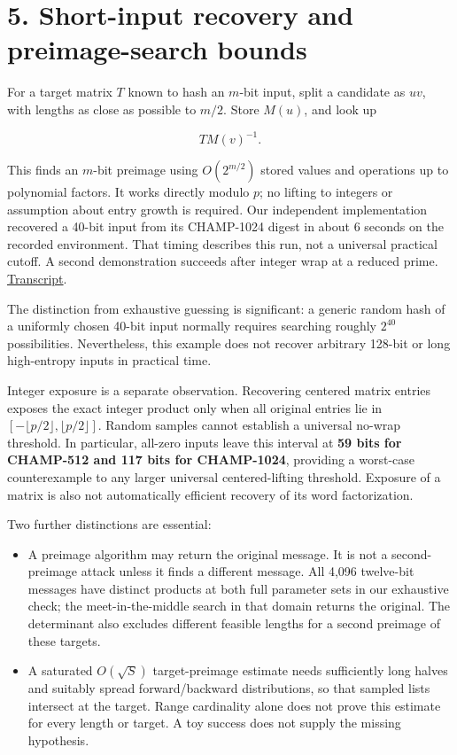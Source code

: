 \documentclass[
  english,
  11pt,
  a4paper,
]{article}
\providecommand{\tightlist}{%
  \setlength{\itemsep}{0pt}\setlength{\parskip}{0pt}}
\begin{document}


\section{5. Short-input recovery and preimage-search
bounds}\label{short-input-recovery-and-preimage-search-bounds}


For a target matrix \(T\) known to hash an \(m\)-bit input, split a
candidate as \(uv\), with lengths as close as possible to \(m/2\). Store
\(M(u)\), and look up

\[
T M(v)^{-1}.
\]

This finds an \(m\)-bit preimage using \(O(2^{m/2})\) stored values and
operations up to polynomial factors. It works directly modulo \(p\); no
lifting to integers or assumption about entry growth is required. Our
independent implementation recovered a 40-bit input from its CHAMP-1024
digest in about 6 seconds on the recorded environment. That timing
describes this run, not a universal practical cutoff. A second
demonstration succeeds after integer wrap at a reduced prime.
\href{evidence/reproduce-full.log}{Transcript}.

The distinction from exhaustive guessing is significant: a generic
random hash of a uniformly chosen 40-bit input normally requires
searching roughly \(2^{40}\) possibilities. Nevertheless, this example
does not recover arbitrary 128-bit or long high-entropy inputs in
practical time.

Integer exposure is a separate observation. Recovering centered matrix
entries exposes the exact integer product only when all original entries
lie in \([-\lfloor p/2\rfloor,\lfloor p/2\rfloor]\). Random samples
cannot establish a universal no-wrap threshold. In particular, all-zero
inputs leave this interval at \textbf{59 bits for CHAMP-512 and 117 bits
for CHAMP-1024}, providing a worst-case counterexample to any larger
universal centered-lifting threshold. Exposure of a matrix is also not
automatically efficient recovery of its word factorization.

Two further distinctions are essential:

\begin{itemize}
\tightlist
\item
  A preimage algorithm may return the original message. It is not a
  second-preimage attack unless it finds a different message. All 4,096
  twelve-bit messages have distinct products at both full parameter sets
  in our exhaustive check; the meet-in-the-middle search in that domain
  returns the original. The determinant also excludes different feasible
  lengths for a second preimage of these targets.
\item
  A saturated \(O(\sqrt S)\) target-preimage estimate needs sufficiently
  long halves and suitably spread forward/backward distributions, so
  that sampled lists intersect at the target. Range cardinality alone
  does not prove this estimate for every length or target. A toy success
  does not supply the missing hypothesis.
\end{itemize}
\end{document}
